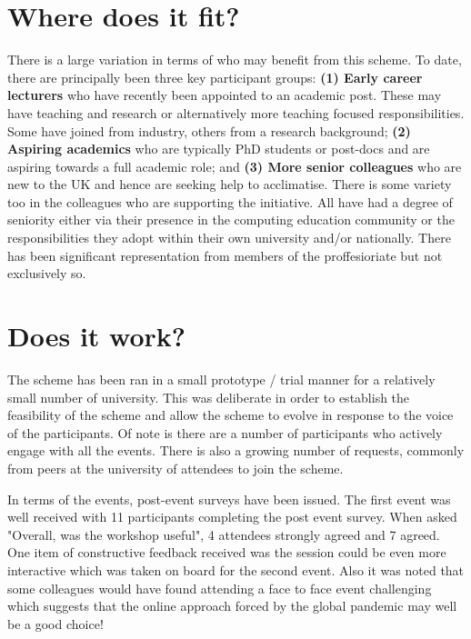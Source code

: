 \documentclass[sigconf]{acmart}
\begin{document}
\section{Where does it fit?}
There is a large variation in terms of who may benefit from this scheme. To date, there are principally been three key participant groups: \textbf{(1) Early career lecturers} who have recently been appointed to an academic post. These may have teaching and research or alternatively more teaching focused responsibilities. Some have joined from industry,  others from a research background; \textbf{ (2) Aspiring academics} who are typically PhD students or post-docs and are aspiring towards a full academic role; and \textbf{(3) More senior colleagues} who are new to the UK and hence are seeking help to acclimatise. There is some variety too in the colleagues who are supporting the initiative. All have had a degree of seniority either via their presence in the computing education community or the responsibilities they adopt within their own university and/or nationally. There has been significant representation from members of the proffesioriate but not exclusively so.

\section{Does it work?}	
\label{Sec:DoesItWork}
The scheme has been ran in a small prototype / trial manner for a relatively small number of university. This was deliberate in order to establish the feasibility of the scheme and allow the scheme to evolve in response to the voice of the participants. Of note is there are a number of participants who actively engage with all the events. There is also a growing number of requests, commonly from peers at the university of attendees to join the scheme.

In terms of the events, post-event surveys have been issued. The first event was well received with 11 participants completing the post event survey. When asked "Overall, was the workshop useful", 4 attendees strongly agreed and 7 agreed. One item of constructive feedback received was the session could be even more interactive which was taken on board for the second event. Also it was noted that some colleagues would have found attending a face to face event challenging which suggests that the online approach forced by the global pandemic may well be a good choice!
\end{document}
